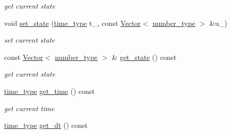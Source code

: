 \begin{DoxyCompactItemize}
\begin{DoxyCompactList}\small\item\em get current state \item\end{DoxyCompactList}\item 
\hypertarget{classhdnum_1_1DIRK_a669ef1d303de0ca56bf76f5a19d56547}{
void \hyperlink{classhdnum_1_1DIRK_a669ef1d303de0ca56bf76f5a19d56547}{set\_\-state} (\hyperlink{classhdnum_1_1DIRK_a91204fa2e007b5eed35034bfe409037b}{time\_\-type} t\_\-, const \hyperlink{classhdnum_1_1Vector}{Vector}$<$ \hyperlink{classhdnum_1_1DIRK_a287d241d2d7cc622d8688bd062b73183}{number\_\-type} $>$ \&u\_\-)}
\label{classhdnum_1_1DIRK_a669ef1d303de0ca56bf76f5a19d56547}

\begin{DoxyCompactList}\small\item\em set current state \item\end{DoxyCompactList}\item 
\hypertarget{classhdnum_1_1DIRK_a80c4b9b62cde9e0aeed6cc483d2f697f}{
const \hyperlink{classhdnum_1_1Vector}{Vector}$<$ \hyperlink{classhdnum_1_1DIRK_a287d241d2d7cc622d8688bd062b73183}{number\_\-type} $>$ \& \hyperlink{classhdnum_1_1DIRK_a80c4b9b62cde9e0aeed6cc483d2f697f}{get\_\-state} () const }
\label{classhdnum_1_1DIRK_a80c4b9b62cde9e0aeed6cc483d2f697f}

\begin{DoxyCompactList}\small\item\em get current state \item\end{DoxyCompactList}\item 
\hypertarget{classhdnum_1_1DIRK_a2291c2a6d41a17beca34aa2015d27047}{
\hyperlink{classhdnum_1_1DIRK_a91204fa2e007b5eed35034bfe409037b}{time\_\-type} \hyperlink{classhdnum_1_1DIRK_a2291c2a6d41a17beca34aa2015d27047}{get\_\-time} () const }
\label{classhdnum_1_1DIRK_a2291c2a6d41a17beca34aa2015d27047}

\begin{DoxyCompactList}\small\item\em get current time \item\end{DoxyCompactList}\item 
\hypertarget{classhdnum_1_1DIRK_aa5e8c88d9d8643d1d69597ec6acc9a86}{
\hyperlink{classhdnum_1_1DIRK_a91204fa2e007b5eed35034bfe409037b}{time\_\-type} \hyperlink{classhdnum_1_1DIRK_aa5e8c88d9d8643d1d69597ec6acc9a86}{get\_\-dt} () const }
\label{classhdnum_1_1DIRK_aa5e8c88d9d8643d1d69597ec6acc9a86}


\end{DoxyCompactItemize}
